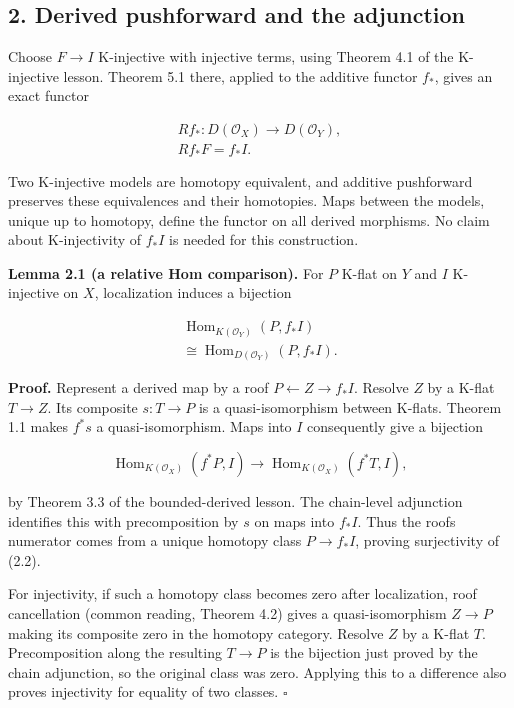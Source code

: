 \documentclass[
  english,
  11pt,
  a4paper,
]{article}
\begin{document}
\subsection{2. Derived pushforward and the
adjunction}\label{derived-pullback-and-pushforward--2-derived-pushforward-and-the-adjunction}

Choose \(F\to I\) K-injective with injective terms, using Theorem 4.1 of
the K-injective lesson. Theorem 5.1 there, applied to the additive
functor \(f_*\), gives an exact functor

\[\begin{gathered}
Rf_*:D(\mathcal O_X)\longrightarrow D(\mathcal O_Y),\\
Rf_*F=f_*I.
\end{gathered}
\tag{2.1}\]

Two K-injective models are homotopy equivalent, and additive pushforward
preserves these equivalences and their homotopies. Maps between the
models, unique up to homotopy, define the functor on all derived
morphisms. No claim about K-injectivity of \(f_*I\) is needed for this
construction.

\textbf{Lemma 2.1 (a relative Hom comparison).} For \(P\) K-flat on
\(Y\) and \(I\) K-injective on \(X\), localization induces a bijection

\[\begin{gathered}
\operatorname{Hom}_{K(\mathcal O_Y)}(P,f_*I)\\
\cong
\operatorname{Hom}_{D(\mathcal O_Y)}(P,f_*I).
\end{gathered}
\tag{2.2}\]

\textbf{Proof.} Represent a derived map by a roof
\(P\leftarrow Z\to f_*I\). Resolve \(Z\) by a K-flat \(T\to Z\). Its
composite \(s:T\to P\) is a quasi-isomorphism between K-flats. Theorem
1.1 makes \(f^*s\) a quasi-isomorphism. Maps into \(I\) consequently
give a bijection

\[\operatorname{Hom}_{K(\mathcal O_X)}(f^*P,I)
\longrightarrow
\operatorname{Hom}_{K(\mathcal O_X)}(f^*T,I),\]

by Theorem 3.3 of the bounded-derived lesson. The chain-level adjunction
identifies this with precomposition by \(s\) on maps into \(f_*I\). Thus
the roof\textquotesingle s numerator comes from a unique homotopy class
\(P\to f_*I\), proving surjectivity of (2.2).

For injectivity, if such a homotopy class becomes zero after
localization, roof cancellation (common reading, Theorem 4.2) gives a
quasi-isomorphism \(Z\to P\) making its composite zero in the homotopy
category. Resolve \(Z\) by a K-flat \(T\). Precomposition along the
resulting \(T\to P\) is the bijection just proved by the chain
adjunction, so the original class was zero. Applying this to a
difference also proves injectivity for equality of two classes.
\(\square\)
\end{document}
